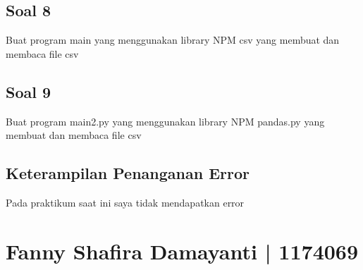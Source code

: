 \subsection{Soal 8}
Buat program main yang menggunakan library NPM csv yang membuat dan membaca file csv




\subsection{Soal 9}
Buat program main2.py yang menggunakan library NPM pandas.py yang membuat dan membaca file csv



\subsection{Keterampilan Penanganan Error}
Pada praktikum saat ini saya tidak mendapatkan error

\section{Fanny Shafira Damayanti | 1174069}
